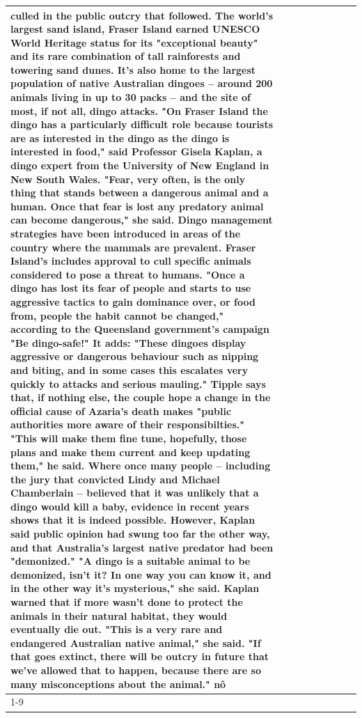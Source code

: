 \begin{table}[H]
\begin{tabular}{lllrlllll}
culled in the public outcry that followed. The world's largest sand island, Fraser Island earned UNESCO World Heritage status for its "exceptional beauty" and its rare combination of tall rainforests and towering sand dunes. It's also home to the largest population of native Australian dingoes -- around 200 animals living in up to 30 packs -- and the site of most, if not all, dingo attacks. "On Fraser Island the dingo has a particularly difficult role because tourists are as interested in the dingo as the dingo is interested in food," said Professor Gisela Kaplan, a dingo expert from the University of New England in New South Wales. "Fear, very often, is the only thing that stands between a dangerous animal and a human. Once that fear is lost any predatory animal can become dangerous," she said. Dingo management strategies have been introduced in areas of the country where the mammals are prevalent. Fraser Island's includes approval to cull specific animals considered to pose a threat to humans. "Once a dingo has lost its fear of people and starts to use aggressive tactics to gain dominance over, or food from, people the habit cannot be changed," according to the Queensland government's campaign "Be dingo-safe!" It adds: "These dingoes display aggressive or dangerous behaviour such as nipping and biting, and in some cases this escalates very quickly to attacks and serious mauling." Tipple says that, if nothing else, the couple hope a change in the official cause of Azaria's death makes "public authorities more aware of their responsibilties." "This will make them fine tune, hopefully, those plans and make them current and keep updating them," he said. Where once many people -- including the jury that convicted Lindy and Michael Chamberlain -- believed that it was unlikely that a dingo would kill a baby, evidence in recent years shows that it is indeed possible. However, Kaplan said public opinion had swung too far the other way, and that Australia's largest native predator had been "demonized." "A dingo is a suitable animal to be demonized, isn't it? In one way you can know it, and in the other way it's mysterious," she said. Kaplan warned that if more wasn't done to protect the animals in their natural habitat, they would eventually die out. "This is a very rare and endangered Australian native animal," she said. "If that goes extinct, there will be outcry in future that we've allowed that to happen, because there are so many misconceptions about the animal." nô \\
\cline{1-9}

\end{tabular}
\end{table}
